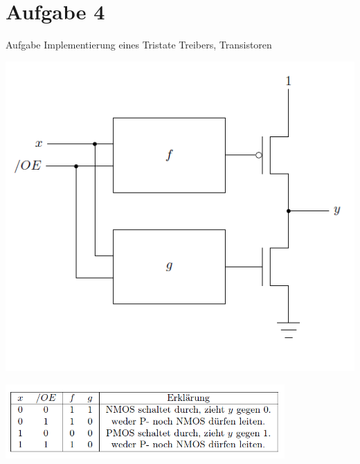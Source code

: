 
\section{Aufgabe 4}

\setcounter{exercise}{1}

%

    \begin{frame}[allowframebreaks]{Aufgabe \thesection}{Implementierung eines Tristate Treibers, Transistoren}
      \begin{exercisenoinc}
        \includegraphics[height=0.5\paperheight, center]{./figures/Tristate-Treiber.png}
      \end{exercisenoinc}
      \begin{solution}
        \includegraphics[width=0.8\textwidth, center]{./figures/Tristate-Treiber-Tabelle.png}\\

\end{solution}
\end{frame}
